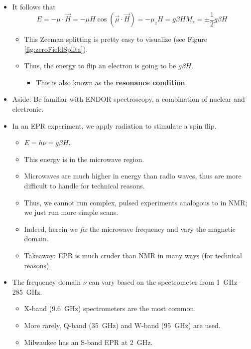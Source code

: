 \documentclass[../notes.tex]{subfiles}
\begin{document}
\begin{itemize}
    \item It follows that
    \begin{equation*}
        E = -\mu\cdot\vec{H}
        = -\mu H\cos(\vec{\mu}\cdot\vec{H})
        = -\mu_zH
        = g\beta HM_s
        = \pm\frac{1}{2}g\beta H
    \end{equation*}
    \begin{itemize}
        \item This Zeeman splitting is pretty easy to visualize (see Figure \ref{fig:zeroFieldSplita}).
        \item Thus, the energy to flip an electron is going to be $g\beta H$.
        \begin{itemize}
            \item This is also known as the \textbf{resonance condition}.
        \end{itemize}
    \end{itemize}
    \item Aside: Be familiar with ENDOR spectroscopy, a combination of nuclear and electronic.
    \item In an EPR experiment, we apply radiation to stimulate a spin flip.
    \begin{itemize}
        \item $E=h\nu=g\beta H$.
        \item This energy is in the microwave region.
        \item Microwaves are much higher in energy than radio waves, thus are more difficult to handle for technical reasons.
        \item Thus, we cannot run complex, pulsed experiments analogous to in NMR; we just run more simple scans.
        \item Indeed, herein we \emph{fix} the microwave frequency and vary the magnetic domain.
        \item Takeaway: EPR is much cruder than NMR in many ways (for technical reasons).
    \end{itemize}
    \item The frequency domain $\nu$ can vary based on the spectrometer from \SIrange{1}{285}{\giga\hertz}.
    \begin{itemize}
        \item X-band (\SI{9.6}{\giga\hertz}) spectrometers are the most common.
        \item More rarely, Q-band (\SI{35}{\giga\hertz}) and W-band (\SI{95}{\giga\hertz}) are used.
        \item Milwaukee has an S-band EPR at \SI{2}{\giga\hertz}.

\end{itemize}
\end{itemize}
\end{document}
